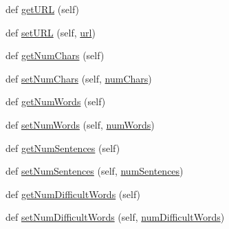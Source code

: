 \begin{DoxyCompactItemize}
\item 
def \hyperlink{class_bridges_1_1data__src__dependent_1_1_book_1_1_book_a048948e1d3009f08d6a9f49ce86bb9e5}{get\+U\+R\+L} (self)
\item 
def \hyperlink{class_bridges_1_1data__src__dependent_1_1_book_1_1_book_a2de52ce91e0b12128509a1c9cbd8e3e3}{set\+U\+R\+L} (self, \hyperlink{class_bridges_1_1data__src__dependent_1_1_book_1_1_book_a4e2f9719a091a7bd9487a3beafb8ad79}{url})
\item 
def \hyperlink{class_bridges_1_1data__src__dependent_1_1_book_1_1_book_a8c0c022771446b725e345d21584be65c}{get\+Num\+Chars} (self)
\item 
def \hyperlink{class_bridges_1_1data__src__dependent_1_1_book_1_1_book_a435be7f7e273e83c0fc2ed519d8af9a4}{set\+Num\+Chars} (self, \hyperlink{class_bridges_1_1data__src__dependent_1_1_book_1_1_book_aca265f2a5dd95bca41455b6502364a8d}{num\+Chars})
\item 
def \hyperlink{class_bridges_1_1data__src__dependent_1_1_book_1_1_book_a3c29daa79692e72abfea02b3e384cf3b}{get\+Num\+Words} (self)
\item 
def \hyperlink{class_bridges_1_1data__src__dependent_1_1_book_1_1_book_a071df3418fe002943a53c6d23d462ba0}{set\+Num\+Words} (self, \hyperlink{class_bridges_1_1data__src__dependent_1_1_book_1_1_book_a0db2ddd13ff6460d0a746f14dd0b09c0}{num\+Words})
\item 
def \hyperlink{class_bridges_1_1data__src__dependent_1_1_book_1_1_book_a840b6b643c394a972a3c699bc0ad8dc0}{get\+Num\+Sentences} (self)
\item 
def \hyperlink{class_bridges_1_1data__src__dependent_1_1_book_1_1_book_a37bafb5c3920bca28a39a6630121d604}{set\+Num\+Sentences} (self, \hyperlink{class_bridges_1_1data__src__dependent_1_1_book_1_1_book_a4369c7a7fa2abdaff7905bac8dea1c78}{num\+Sentences})
\item 
def \hyperlink{class_bridges_1_1data__src__dependent_1_1_book_1_1_book_af1de8ebe35263b5d437a6ea982536df9}{get\+Num\+Difficult\+Words} (self)
\item 
def \hyperlink{class_bridges_1_1data__src__dependent_1_1_book_1_1_book_a4cc1e0b26102b9a81ef8b9c942d0b3c6}{set\+Num\+Difficult\+Words} (self, \hyperlink{class_bridges_1_1data__src__dependent_1_1_book_1_1_book_a1b9c36a1c840d703e24e033e8ad2ea4c}{num\+Difficult\+Words})
\end{DoxyCompactItemize}
